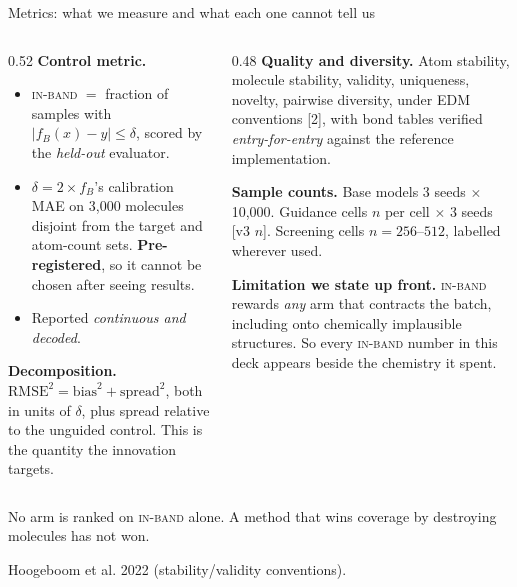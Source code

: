 \documentclass[aspectratio=169,10pt]{beamer}
\newcommand{\theslidelabel}{}
\newcommand{\lbl}[1]{\renewcommand{\theslidelabel}{#1}}
\newcommand{\srcs}[1]{\vfill{\raggedleft\color{grayt}\fontsize{4.9}{5.6}\selectfont #1\par}}
\newcommand{\TODO}[1]{\textcolor{accent}{\scriptsize[#1]}}
\newcommand{\ib}{\textsc{in-band}}
\newcommand{\take}[1]{\vspace{0.4ex}\colorbox{black!6}{\parbox{0.97\linewidth}{\footnotesize #1}}}
\begin{document}
\lbl{1e}
\begin{frame}{Metrics: what we measure and what each one cannot tell us}
  \begin{columns}[T]
  \begin{column}{0.52\textwidth}
    \textbf{Control metric.}
    \begin{itemize}\setlength\itemsep{0.1em}
      \item \ib{} $=$ fraction of samples with
        $|f_B(x)-y|\le\delta$, scored by the \emph{held-out} evaluator.
      \item $\delta = 2\times f_B$'s calibration MAE on 3{,}000 molecules disjoint
        from the target and atom-count sets. \textbf{Pre-registered}, so it cannot
        be chosen after seeing results.
      \item Reported \emph{continuous and decoded}.
    \end{itemize}
    \smallskip
    \textbf{Decomposition.}
    $\mathrm{RMSE}^2=\mathrm{bias}^2+\mathrm{spread}^2$, both in units of $\delta$,
    plus spread relative to the unguided control. This is the quantity the
    innovation targets.
  \end{column}
  \begin{column}{0.48\textwidth}
    \textbf{Quality and diversity.} Atom stability, molecule stability, validity,
    uniqueness, novelty, pairwise diversity, under EDM conventions [2], with bond
    tables verified \emph{entry-for-entry} against the reference implementation.
    \smallskip

    \textbf{Sample counts.} Base models 3 seeds $\times$ 10{,}000. Guidance cells
    $n$ per cell $\times$ 3 seeds \TODO{v3 $n$}. Screening cells $n=256$--$512$,
    labelled wherever used.
    \smallskip

    \textbf{Limitation we state up front.} \ib{} rewards \emph{any} arm that
    contracts the batch, including onto chemically implausible structures. So every
    \ib{} number in this deck appears beside the chemistry it spent.
  \end{column}
  \end{columns}

  \take{No arm is ranked on \ib{} alone. A method that wins coverage by destroying
  molecules has not won.}

  \srcs{[2] Hoogeboom et al. 2022 (stability/validity conventions).}
\end{frame}
\end{document}
